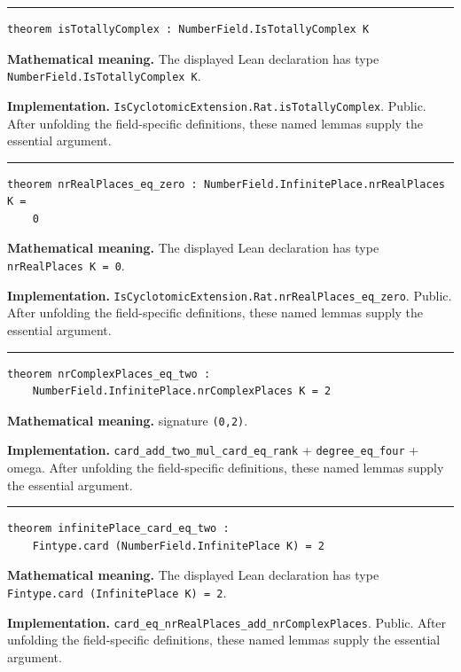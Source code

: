 \documentclass[UTF8,a4paper,11pt,fontset=fandol]{ctexart}
\theoremstyle{definition}
\newcommand{\statementsep}{\par\medskip\hrule\medskip}
\begin{document}
\statementsep
\begin{verbatim}
theorem isTotallyComplex : NumberField.IsTotallyComplex K
\end{verbatim}
\noindent\textbf{Mathematical meaning.} The displayed Lean declaration has type \texttt{NumberField.\allowbreak{}IsTotallyComplex K}.\par
\noindent\textbf{Implementation.} \texttt{IsCyclotomicExtension.\allowbreak{}Rat.\allowbreak{}isTotallyComplex}. Public. After unfolding the field-specific definitions, these named lemmas supply the essential argument.\par
\statementsep
\begin{verbatim}
theorem nrRealPlaces_eq_zero : NumberField.InfinitePlace.nrRealPlaces K =
    0
\end{verbatim}
\noindent\textbf{Mathematical meaning.} The displayed Lean declaration has type \texttt{nrRealPlaces K = 0}.\par
\noindent\textbf{Implementation.} \texttt{IsCyclotomicExtension.\allowbreak{}Rat.\allowbreak{}nrRealPlaces\_\allowbreak{}eq\_\allowbreak{}zero}. Public. After unfolding the field-specific definitions, these named lemmas supply the essential argument.\par
\statementsep
\begin{verbatim}
theorem nrComplexPlaces_eq_two :
    NumberField.InfinitePlace.nrComplexPlaces K = 2
\end{verbatim}
\noindent\textbf{Mathematical meaning.} signature \texttt{(0,2)}.\par
\noindent\textbf{Implementation.} \texttt{card\_\allowbreak{}add\_\allowbreak{}two\_\allowbreak{}mul\_\allowbreak{}card\_\allowbreak{}eq\_\allowbreak{}rank} + \texttt{degree\_\allowbreak{}eq\_\allowbreak{}four} + omega. After unfolding the field-specific definitions, these named lemmas supply the essential argument.\par
\statementsep
\begin{verbatim}
theorem infinitePlace_card_eq_two :
    Fintype.card (NumberField.InfinitePlace K) = 2
\end{verbatim}
\noindent\textbf{Mathematical meaning.} The displayed Lean declaration has type \texttt{Fintype.\allowbreak{}card (InfinitePlace K) = 2}.\par
\noindent\textbf{Implementation.} \texttt{card\_\allowbreak{}eq\_\allowbreak{}nrRealPlaces\_\allowbreak{}add\_\allowbreak{}nrComplexPlaces}. Public. After unfolding the field-specific definitions, these named lemmas supply the essential argument.\par
\end{document}

